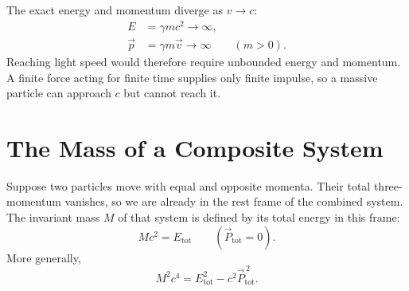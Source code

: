 \begin{classroomqa}
\end{classroomqa}

The exact energy and momentum diverge as \(v\to c\):
\begin{equation}
\begin{aligned}
E&=\gamma mc^2\longrightarrow\infty,\\
\vec p&=\gamma m\vec v\longrightarrow\infty
\qquad(m>0).
\end{aligned}
\end{equation}
Reaching light speed would therefore require unbounded energy and momentum. A finite force acting for finite time supplies only finite impulse, so a massive particle can approach \(c\) but cannot reach it.

\begin{classroomqa}
\end{classroomqa}

\section{The Mass of a Composite System}

Suppose two particles move with equal and opposite momenta. Their total three-momentum vanishes, so we are already in the rest frame of the combined system. The invariant mass \(M\) of that system is defined by its total energy in this frame:
\begin{equation}
Mc^2=E_{\mathrm{tot}}
\qquad
(\vec P_{\mathrm{tot}}=0).
\end{equation}
More generally,
\begin{equation}
M^2c^4
=
E_{\mathrm{tot}}^2-c^2\vec P_{\mathrm{tot}}^{\,2}.
\label{eq:sr3-composite-mass}
\end{equation}

